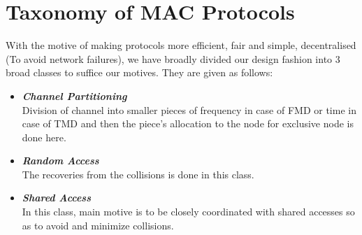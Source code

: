 \documentclass[12pt]{article}
\begin{document}

\section{Taxonomy of MAC Protocols}
With the motive of making protocols more efficient, fair and simple, decentralised (To avoid network failures), we have broadly divided our design fashion into 3 broad classes to suffice our motives. They are given as follows:

\begin{itemize}
    \item \textbf{\textit{Channel Partitioning}} \\
        Division of channel into smaller pieces of frequency in case of FMD or time in case of TMD and then the piece's allocation to the node for exclusive node is done here.
    \item \textbf{\textit{Random Access}} \\
        The recoveries from the collisions is done in this class.
    \item \textbf{\textit{Shared Access}} \\
        In this class, main motive is to be closely coordinated with shared accesses so as to avoid and minimize collisions.
\end{itemize}
\end{document}
